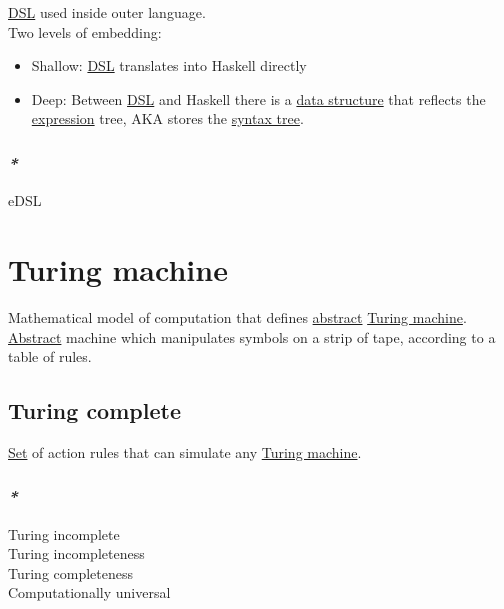 \documentclass[a4paper,14pt,oneside]{book}
\begin{document}
\hyperref[org6b223c3]{DSL} used inside outer language.\\

Two levels of embedding:\\

\begin{itemize}
\item Shallow: \hyperref[org6b223c3]{DSL} translates into Haskell directly\\
\item Deep: Between \hyperref[org6b223c3]{DSL} and Haskell there is a \hyperref[orga9162f5]{data structure} that reflects the \hyperref[org3ea9088]{expression} tree, AKA stores the \hyperref[orgef705a0]{syntax tree}.\\
\end{itemize}

\subsection{\emph{*}}
\label{sec:org40c92f7}

\label{orga169611}eDSL\\

\chapter{\label{org91ec957}Turing machine}
\label{sec:orgad987ae}
Mathematical model of computation that defines \hyperref[org9c8391a]{abstract} \hyperref[org91ec957]{Turing machine}. \hyperref[org9c8391a]{Abstract} machine which manipulates symbols on a strip of tape, according to a table of rules.\\

\section{\label{orgab6580e}Turing complete}
\label{sec:org9720a3c}

\hyperref[org0f7f8fa]{Set} of action rules that can simulate any \hyperref[org91ec957]{Turing machine}.\\

\subsection{\emph{*}}
\label{sec:org114efb0}

\label{orgab9bf82}Turing incomplete\\
\label{org1277db4}Turing incompleteness\\
\label{orgc473fde}Turing completeness\\
\label{org6b6428c}Computationally universal\\
\end{document}
